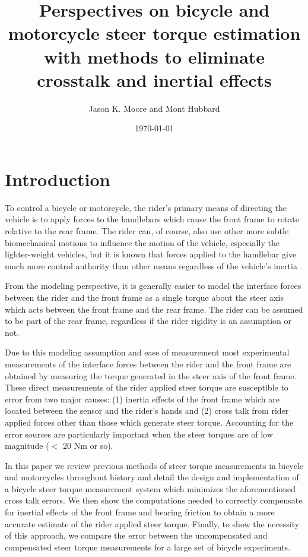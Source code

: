 \documentclass[a4paper]{article}
\title{Perspectives on bicycle and motorcycle steer torque estimation with
  methods to eliminate crosstalk and inertial effects}
\author{Jason K. Moore and Mont Hubbard}
\date{\today}
\begin{document}
\maketitle

\section*{Introduction}

To control a bicycle or motorcycle, the rider's primary means of directing the
vehicle is to apply forces to the handlebars which cause the front frame to
rotate relative to the rear frame. The rider can, of course, also use other
more subtle biomechanical motions to influence the motion of the vehicle,
especially the lighter-weight vehicles, but it is known that forces
applied to the handlebar give much more control authority than other means
regardless of the vehicle's inertia \cite{Sharp2007,Sharp2008a}.

From the modeling perspective, it is generally easier to model the interface
forces between the rider and the front frame as a single torque about the steer
axis which acts between the front frame and the rear frame. The rider can be
assumed to be part of the rear frame, regardless if the rider rigidity is an
assumption or not.

Due to this modeling assumption and ease of measurement most experimental
measurements of the interface forces between the rider and the front frame are
obtained by measuring the torque generated in the steer axis of the front
frame. These direct measurements of the rider applied steer torque are
susceptible to error from two major causes: (1) inertia effects of the front
frame which are located between the sensor and the rider's hands and (2) cross
talk from rider applied forces other than those which generate steer torque.
Accounting for the error sources are particularly important when the steer
torques are of low magnitude ($<$ 20 Nm or so).

In this paper we review previous methods of steer torque measurements in
bicycle and motorcycles throughout history and detail the design and
implementation of a bicycle steer torque measurement system which minimizes the
aforementioned cross talk errors. We then show the computations needed to
correctly compensate for inertial effects of the front frame and bearing
friction to obtain a more accurate estimate of the rider applied steer torque.
Finally, to show the necessity of this approach, we compare the error
between the uncompensated and compensated steer torque measurements for a large
set of bicycle experiments.
\end{document}

